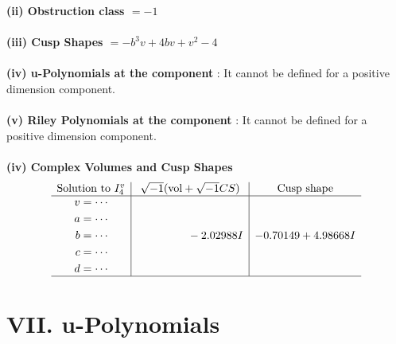 \documentclass[1p]{elsarticle_modified}
\theoremstyle{definition}
\newcommand{\I}{\sqrt{-1}}
\begin{document}
\flushleft \textbf{(ii) Obstruction class $= -1$}\\~\\
\flushleft \textbf{(iii) Cusp Shapes $= - b^3 v+4 b v+v^2-4$}\\~\\
\flushleft \textbf{(iv) u-Polynomials at the component} : It cannot be defined for a positive dimension component.\\~\\
\flushleft \textbf{(v) Riley Polynomials at the component} : It cannot be defined for a positive dimension component.\\~\\
\newpage\flushleft \textbf{(iv) Complex Volumes and Cusp Shapes}
$$\begin{array}{c|c|c} 
\text{Solution to }I^v_{4}& \I (\text{vol} + \sqrt{-1}CS) & \text{Cusp shape}\\
 \hline 
\begin{aligned}
v &= \cdots \\
a &= \cdots \\
b &= \cdots \\
c &= \cdots \\
d &= \cdots\end{aligned}
 & \phantom{-0.000000 } -2.02988 I & -0.70149 + 4.98668 I\\
 \hline 
 \end{array}
$$
\newpage\renewcommand{\arraystretch}{1}
\centering \section*{ VII. u-Polynomials}
\end{document}
